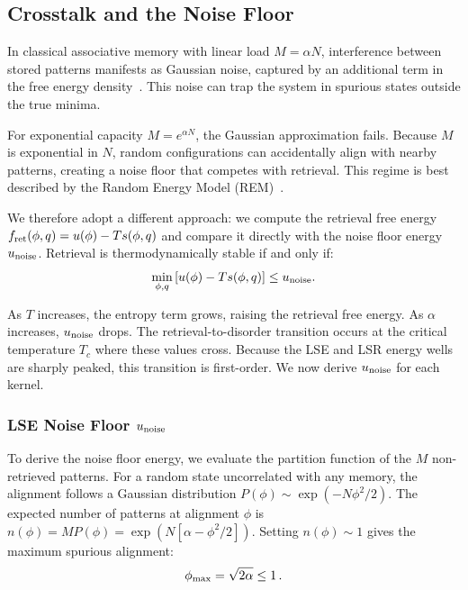 \documentclass{article}
\theoremstyle{plain}
\theoremstyle{definition}
\theoremstyle{remark}
\begin{document}
\subsection{Crosstalk and the Noise Floor}

In classical associative memory with linear load $M = \alpha N$, interference between stored patterns manifests as Gaussian noise, captured by an additional term in the free energy density~\citep{amit1987statistical}. This noise can trap the system in spurious states outside the true minima.

For exponential capacity $M = e^{\alpha N}$, the Gaussian approximation fails. Because $M$ is exponential in $N$, random configurations can accidentally align with nearby patterns, creating a noise floor that competes with retrieval. This regime is best described by the Random Energy Model (REM)~\citep{derrida1980random}.

We therefore adopt a different approach: we compute the retrieval free energy $f_{\rm ret}(\phi, q) = u(\phi) - T s(\phi, q)$ and compare it directly with the noise floor energy $u_{\rm noise}$. Retrieval is thermodynamically stable if and only if:
\begin{equation}
    \min_{\phi, q} \left[ u(\phi) - T s(\phi, q) \right] \leq u_{\rm noise}.
    \label{eq:stability}
\end{equation}

As $T$ increases, the entropy term grows, raising the retrieval free energy. As $\alpha$ increases, $u_{\rm noise}$ drops. The retrieval-to-disorder transition occurs at the critical temperature $T_c$ where these values cross. Because the LSE and LSR energy wells are sharply peaked, this transition is first-order. We now derive $u_{\rm noise}$ for each kernel.


\subsubsection{LSE Noise Floor $u_{\rm noise}$}

To derive the noise floor energy, we evaluate the partition function of the $M$ non-retrieved patterns. For a random state uncorrelated with any memory, the alignment follows a Gaussian distribution $P(\phi) \sim \exp(-N\phi^2/2)$. The expected number of patterns at alignment $\phi$ is $n(\phi) = M P(\phi) = \exp(N[\alpha - \phi^2/2])$. Setting $n(\phi) \sim 1$ gives the maximum spurious alignment:
\begin{equation}
    \phi_{\rm max} = \sqrt{2\alpha} \le 1\,.
    \label{eq:max_spur}
\end{equation}
\end{document}
